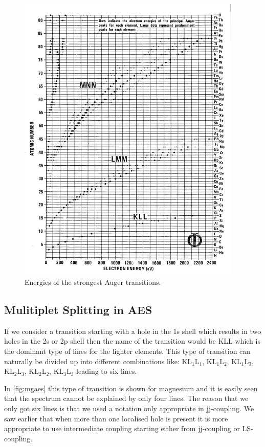 \begin{figure}[h!]
	\begin{center}
	\includegraphics[width=0.95\textwidth]{figures/stronges_auger_lines.png}
	\caption{Energies of the strongest Auger transitions.}
	\label{fig:aestrans}
	\end{center}
\end{figure}

\subsection{Mulitiplet Splitting in AES}
If we consider a transition starting with  a hole in the 1s shell which results in two holes in the 2s or 2p shell then the name of the transition would be KLL which is the dominant type of lines for the lighter elements. This type of transition can naturally be divided up into different combinations like: KL$_1$L$_1$, KL$_1$L$_2$, KL$_1$L$_3$, KL$_2$L$_3$, KL$_2$L$_2$, KL$_3$L$_3$ leading to six lines.

In \autoref{fig:mgaes} this type of transition is shown for magnesium and it is easily seen that the spectrum cannot be explained by only four lines. The reason that we only got six lines is that we used a notation  only appropriate in jj-coupling. We saw earlier that when more than one localised hole is present it is more appropriate to use intermediate coupling starting either from jj-coupling or LS-coupling.

